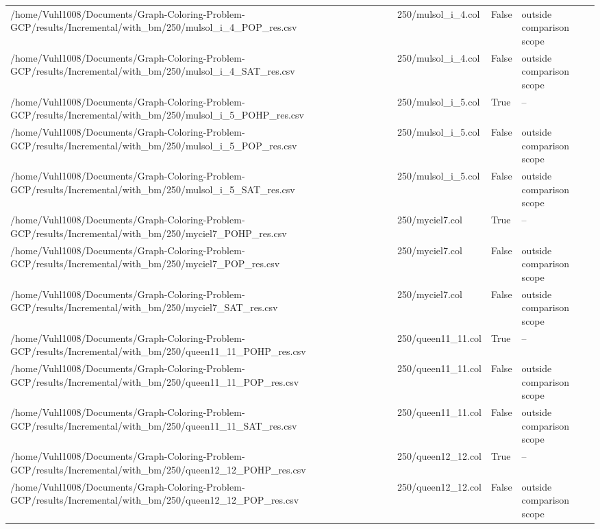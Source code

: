 \begin{table}[htbp]
\begin{tabular}{llll}
/home/Vuhl1008/Documents/Graph-Coloring-Problem-GCP/results/Incremental/with\_bm/250/mulsol\_i\_4\_POP\_res.csv & 250/mulsol\_i\_4.col & False & outside comparison scope \\
/home/Vuhl1008/Documents/Graph-Coloring-Problem-GCP/results/Incremental/with\_bm/250/mulsol\_i\_4\_SAT\_res.csv & 250/mulsol\_i\_4.col & False & outside comparison scope \\
/home/Vuhl1008/Documents/Graph-Coloring-Problem-GCP/results/Incremental/with\_bm/250/mulsol\_i\_5\_POHP\_res.csv & 250/mulsol\_i\_5.col & True & -- \\
/home/Vuhl1008/Documents/Graph-Coloring-Problem-GCP/results/Incremental/with\_bm/250/mulsol\_i\_5\_POP\_res.csv & 250/mulsol\_i\_5.col & False & outside comparison scope \\
/home/Vuhl1008/Documents/Graph-Coloring-Problem-GCP/results/Incremental/with\_bm/250/mulsol\_i\_5\_SAT\_res.csv & 250/mulsol\_i\_5.col & False & outside comparison scope \\
/home/Vuhl1008/Documents/Graph-Coloring-Problem-GCP/results/Incremental/with\_bm/250/myciel7\_POHP\_res.csv & 250/myciel7.col & True & -- \\
/home/Vuhl1008/Documents/Graph-Coloring-Problem-GCP/results/Incremental/with\_bm/250/myciel7\_POP\_res.csv & 250/myciel7.col & False & outside comparison scope \\
/home/Vuhl1008/Documents/Graph-Coloring-Problem-GCP/results/Incremental/with\_bm/250/myciel7\_SAT\_res.csv & 250/myciel7.col & False & outside comparison scope \\
/home/Vuhl1008/Documents/Graph-Coloring-Problem-GCP/results/Incremental/with\_bm/250/queen11\_11\_POHP\_res.csv & 250/queen11\_11.col & True & -- \\
/home/Vuhl1008/Documents/Graph-Coloring-Problem-GCP/results/Incremental/with\_bm/250/queen11\_11\_POP\_res.csv & 250/queen11\_11.col & False & outside comparison scope \\
/home/Vuhl1008/Documents/Graph-Coloring-Problem-GCP/results/Incremental/with\_bm/250/queen11\_11\_SAT\_res.csv & 250/queen11\_11.col & False & outside comparison scope \\
/home/Vuhl1008/Documents/Graph-Coloring-Problem-GCP/results/Incremental/with\_bm/250/queen12\_12\_POHP\_res.csv & 250/queen12\_12.col & True & -- \\
/home/Vuhl1008/Documents/Graph-Coloring-Problem-GCP/results/Incremental/with\_bm/250/queen12\_12\_POP\_res.csv & 250/queen12\_12.col & False & outside comparison scope \\

\end{tabular}
\end{table}
